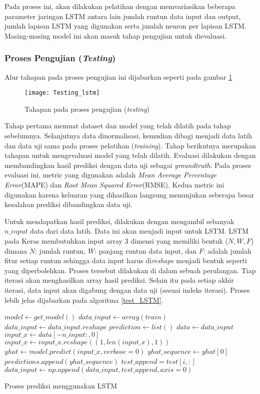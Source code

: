 \documentclass[../thesis.tex]{subfiles}
\begin{document}
Pada proses ini, akan dilakukan pelatihan dengan memvariasikan beberapa parameter jaringan LSTM antara lain jumlah runtun data input dan output, jumlah lapisan LSTM yang digunakan serta jumlah neuron per lapisan LSTM. 
Masing-masing model ini akan masuk tahap pengujian untuk dievaluasi.

\subsubsection{Proses Pengujian (\textit{Testing})}
Alur tahapan pada proses pengujian ini dijabarkan seperti pada gambar \ref{lstm_testing}
\begin{figure}[htp]
	\centering
	\texttt{[image: Testing\_lstm]}
	\caption{Tahapan pada proses pengujian (\textit{testing})}
	\label{lstm_testing}
\end{figure}
Tahap pertama memuat dataset dan model yang telah dilatih pada tahap sebelumnya. Selanjutnya data dinormalisasi, kemudian dibagi menjadi data latih dan data uji sama pada proses pelatihan (\textit{training}).
Tahap berikutnya merupakan tahapan untuk mengevaluasi model yang telah dilatih. Evaluasi dilakukan dengan membandingkan hasil prediksi dengan data uji sebagai \textit{groundtruth}. Pada proses evaluasi ini, metric yang digunakan adalah \textit{Mean Average Percentage Error}(MAPE) dan \textit{Root Mean Squared Error}(RMSE). Kedua metric ini digunakan karena keluaran yang dihasilkan langsung menunjukan seberapa besar kesalahan prediksi dibandingkan data uji. 

Untuk mendapatkan hasil prediksi, dilakukan dengan mengambil sebanyak $n\_input$ data dari data latih. Data ini akan menjadi input untuk LSTM. LSTM pada Keras membutuhkan input array 3 dimensi yang memiliki bentuk ($N, W, F$) dimana $N$: jumlah runtun, $W$: panjang runtun data input, dan $F$: adalah jumlah fitur setiap runtun sehingga data input harus di\textit{reshape} menjadi bentuk seperti yang diperbolehkan.
Proses tersebut dilakukan di dalam sebuah perulangan. Tiap iterasi akan menghasilkan array hasil prediksi. Selain itu pada setiap akhir iterasi, data input akan digabung dengan data uji (sesuai indeks iterasi). Proses lebih jelas dijabarkan pada algoritma \ref{test_LSTM}.
\begin{algorithm}[htp]
	\begin{algorithmic}[1]
		\State $model \leftarrow get\_model()$
		\State $data\_input \leftarrow array(train)$
		\State $data\_input \leftarrow data\_input.reshape$
		\State $prediction \leftarrow list()$
			\State $data \leftarrow data\_input$
			\State $input\_x \leftarrow data[-n\_input:,0]$
			\State $input\_x \leftarrow input\_x.reshape((1, len(input\_x), 1))$
			\State $yhat \leftarrow model.predict(input\_x, verbose=0)$
			\State $yhat\_sequence \leftarrow yhat[0]$
			\State $predictions.append(yhat\_sequence)$
			\State $test\_append = test[i, :]$
			\State $data\_input \leftarrow np.append(data\_input, test\_append, axis=0)$
		\EndFor
	\EndFunction
	\end{algorithmic}
	\caption{Proses prediksi menggunakan LSTM}
	\label{test_LSTM}
\end{algorithm}
\end{document}
